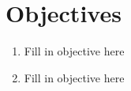 \documentclass[main.tex]{subfiles}
\begin{document}
\section*{Objectives}
\begin{comment}

    A well-written objective, often referred to as a learning objective or learning outcome, should be:
    1. **Specific:** It should clearly define what a student will be able to do by the end of the lesson.
    2. **Measurable:** It should be quantifiable in some way, whether that's through a test, an activity, or another form of assessment.
    3. **Achievable:** It should be realistic considering the students' current level of knowledge and the time allotted.
    4. **Relevant:** It should align with the overall goals of the course or curriculum.
    5. **Time-bound:** It should be achievable within a certain time frame, usually by the end of the lesson, unit, or course.
    This framework is often referred to as "SMART" objectives.
    The assessment should then be designed to directly measure whether or not each objective has been met. For instance, if your objective is "By the end of this lesson, students will be able to identify and explain the five major causes of World War I", your assessment might be a quiz that requires students to do exactly that. 

    Moreover, there should be a clear alignment (often referred to as "alignment of assessment") between your learning objectives and your assessment methods. For example, if one of your objectives requires critical thinking, then your assessment should not simply require factual recall. 

    Additionally, using a variety of assessment methods (such as quizzes, homework assignments, in-class discussions, and so on) can provide a more comprehensive picture of whether the students have met the objectives, as different students may excel in different types of assessments. 

    Ultimately, the objectives should guide the instruction and the assessment should measure the degree to which the instruction has enabled students to meet the objectives. This linkage between the objectives and assessment is critical to ensuring that the lesson is effective and that students' learning is maximized.

\end{comment}
\begin{enumerate}
  \item  Fill in objective here
  \item  Fill in objective here
\end{enumerate}
\end{document}
